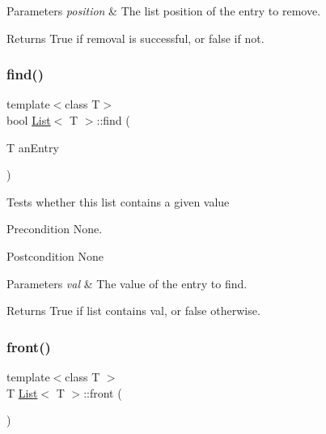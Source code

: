 \begin{DoxyParams}{Parameters}
{\em position} & The list position of the entry to remove. \\
\hline
\end{DoxyParams}
\begin{DoxyReturn}{Returns}
True if removal is successful, or false if not. 
\end{DoxyReturn}
\mbox{\label{class_list_a2be90274aca8ed14ede6d6892b4e82f1}} 
\subsubsection{\texorpdfstring{find()}{find()}}
{\footnotesize\ttfamily template$<$class T$>$ \\
bool \hyperlink{class_list}{List}$<$ T $>$\+::find (\begin{DoxyParamCaption}\item[{T}]{an\+Entry }\end{DoxyParamCaption})}

Tests whether this list contains a given value \begin{DoxyPrecond}{Precondition}
None. 
\end{DoxyPrecond}
\begin{DoxyPostcond}{Postcondition}
None 
\end{DoxyPostcond}

\begin{DoxyParams}{Parameters}
{\em val} & The value of the entry to find. \\
\hline
\end{DoxyParams}
\begin{DoxyReturn}{Returns}
True if list contains val, or false otherwise. 
\end{DoxyReturn}
\mbox{\label{class_list_a2606aeb0b00885fd7b3037a29ae28c8b}} 
\subsubsection{\texorpdfstring{front()}{front()}}
{\footnotesize\ttfamily template$<$class T $>$ \\
T \hyperlink{class_list}{List}$<$ T $>$\+::front (\begin{DoxyParamCaption}{ }\end{DoxyParamCaption})}

